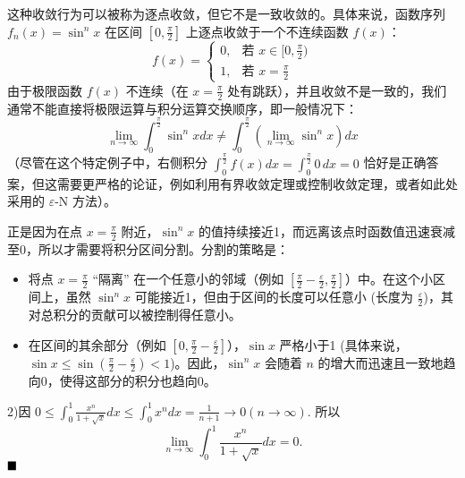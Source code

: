 \documentclass[lang=cn,newtx,10pt,scheme=chinese]{elegantbook}
\begin{document}
\begin{solution}
\begin{remark}
    这种收敛行为可以被称为逐点收敛，但它不是一致收敛的。具体来说，函数序列 $f_n(x) = \sin^n x$ 在区间 $[0, \frac{\pi}{2}]$ 上逐点收敛于一个不连续函数 $f(x)$：
    $$ f(x) = \begin{cases} 0, & \text{若 } x \in [0, \frac{\pi}{2}) \\ 1, & \text{若 } x = \frac{\pi}{2} \end{cases} $$
    由于极限函数 $f(x)$ 不连续（在 $x=\frac{\pi}{2}$ 处有跳跃），并且收敛不是一致的，我们通常不能直接将极限运算与积分运算交换顺序，即一般情况下：
    $$ \lim\limits_{n \to \infty} \int_{0}^{\frac{\pi}{2}} \sin^{n} x dx \neq \int_{0}^{\frac{\pi}{2}} \left(\lim\limits_{n \to \infty} \sin^{n} x\right) dx $$
    （尽管在这个特定例子中，右侧积分 $\int_{0}^{\frac{\pi}{2}} f(x) dx = \int_{0}^{\frac{\pi}{2}} 0 \, dx = 0$ 恰好是正确答案，但这需要更严格的论证，例如利用有界收敛定理或控制收敛定理，或者如此处采用的 $\varepsilon$-N 方法）。

    正是因为在点 $x=\frac{\pi}{2}$ 附近，$\sin^n x$ 的值持续接近1，而远离该点时函数值迅速衰减至0，所以才需要将积分区间分割。分割的策略是：
    \begin{itemize}
        \item 将点 $x=\frac{\pi}{2}$ ``隔离'' 在一个任意小的邻域（例如 $[\frac{\pi}{2}-\frac{\varepsilon}{2}, \frac{\pi}{2}]$）中。在这个小区间上，虽然 $\sin^n x$ 可能接近1，但由于区间的长度可以任意小 (长度为 $\frac{\varepsilon}{2}$)，其对总积分的贡献可以被控制得任意小。
        \item 在区间的其余部分（例如 $[0, \frac{\pi}{2}-\frac{\varepsilon}{2}]$），$\sin x$ 严格小于1 (具体来说，$\sin x \le \sin(\frac{\pi}{2}-\frac{\varepsilon}{2}) < 1$)。因此，$\sin^n x$ 会随着 $n$ 的增大而迅速且一致地趋向0，使得这部分的积分也趋向0。
    \end{itemize}
\end{remark}

2)因 $0 \leqslant \int_{0}^{1} \frac{x^{n}}{1 + \sqrt{x}} dx \leqslant \int_{0}^{1} x^{n} dx = \frac{1}{n+1} \to 0 (n \to \infty)$. 所以
$$\lim\limits_{n \to \infty} \int_{0}^{1} \frac{x^{n}}{1 + \sqrt{x}} dx = 0.$$ $\hfill \blacksquare$

\end{solution}
\end{document}
